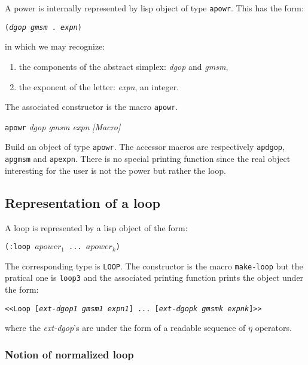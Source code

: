 A power is internally represented by  lisp object of type  {\tt apowr}. This has the form:
\begin{center}
{\tt ({\em dgop} {\em gmsm} . {\em expn})}
\end{center}
in which we may recognize:
\begin{enumerate}
\item the components of the abstract simplex: {\em dgop} and {\em gmsm},
\item the exponent of the letter: {\em expn}, an integer.
\end{enumerate}
The associated  constructor is the macro {\tt apowr}.
\vskip 0.45cm
{\parindent=0mm
{\leftskip=5mm 
{\tt apowr} {\em dgop gmsm expn} \hfill {\em [Macro]} \par}
{\leftskip=15mm 
Build an object of type  {\tt apowr}.
The accessor macros  are respectively {\tt apdgop},  {\tt apgmsm} and {\tt apexpn}. There
is no special printing function since the real object interesting for the user is not
the power but rather the loop.\par}
}

\subsection{Representation of a loop}

A loop is represented by a lisp object of the form:
\begin{center} {\tt (:loop $apower_1$ ... $apower_k$)} \end{center}
The corresponding type is {\tt LOOP}.
The  constructor is the macro {\tt make-loop} but the pratical one is {\tt loop3} and the associated
printing function prints the object under the form:
\begin{center} 
{\tt <<Loop [{\em ext-dgop1 gmsm1} {\em expn1}] ... [{\em ext-dgopk gmsmk} {\em expnk}]>>}
\end{center}
where the {\em ext-dgop}'s are under the form of a readable sequence of $\eta$ operators.

\subsubsection {Notion of normalized loop}

